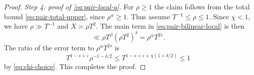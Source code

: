 \documentclass[10pt,a4paper]{amsart}
\newcommand{\eps}{\varepsilon}
\begin{document}
\begin{proof}
\medskip
\noindent\emph{Step 4: proof of \eqref{eq:pair-local-a}.}
For $\rho\ge1$ the claim follows from
the total bound \eqref{eq:pair-total-upper}, since $\rho^\alpha\ge1$.
Thus assume $T^{-\chi}\le\rho\le1$.  Since $\chi<1$, we have
$\rho\gg T^{-1}$ and $X\asymp\rho T^2$.  The main term in
\eqref{eq:pair-bilinear-local} is then
$$
 \ll \rho T^\beta(\rho T^2)^\delta
 =\rho^\alpha T^{2s}.
$$
The ratio of the error term to $\rho^\alpha T^{2s}$ is
$$
 T^{1-s+\eps}\rho^{-1-\delta/2}
 \le T^{1-s+\eps+\chi(1+\delta/2)}\le1
$$
by \eqref{eq:chi-choice}.  This completes the proof.
\end{proof}
\end{document}
